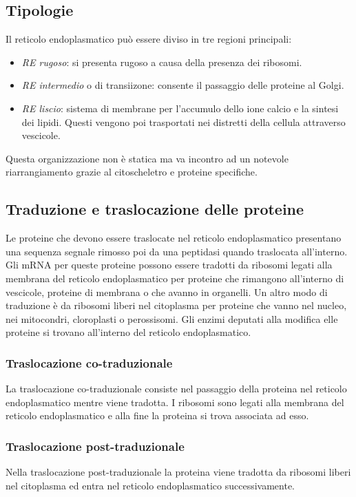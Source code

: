 	\subsection{Tipologie}
	Il reticolo endoplasmatico pu\`o essere diviso in tre regioni principali:
	\begin{multicols}{2}
		\begin{itemize}
			\item \emph{RE rugoso}: si presenta rugoso a causa della presenza dei ribosomi.
			\item \emph{RE intermedio} o di transiizone: consente il passaggio delle proteine al Golgi.
			\item \emph{RE liscio}: sistema di membrane per l'accumulo dello ione calcio e la sintesi dei lipidi.
				Questi vengono poi trasportati nei distretti della cellula attraverso vescicole.
		\end{itemize}
	\end{multicols}
	Questa organizzazione non \`e statica ma va incontro ad un notevole riarrangiamento grazie al citoscheletro e proteine specifiche.

	\subsection{Traduzione e traslocazione delle proteine}
	Le proteine che devono essere traslocate nel reticolo endoplasmatico presentano una sequenza segnale rimosso poi da una peptidasi quando traslocata all'interno.
	Gli mRNA per queste proteine possono essere tradotti da ribosomi legati alla membrana del reticolo endoplasmatico per proteine che rimangono all'interno di vescicole, proteine di membrana o che avanno in organelli.
	Un altro modo di traduzione \`e da ribosomi liberi nel citoplasma per proteine che vanno nel nucleo, nei mitocondri, cloroplasti o perossisomi.
	Gli enzimi deputati alla modifica elle proteine si trovano all'interno del reticolo endoplasmatico.

		\subsubsection{Traslocazione co-traduzionale}
		La traslocazione co-traduzionale consiste nel passaggio della proteina nel reticolo endoplasmatico mentre viene tradotta.
		I ribosomi sono legati alla membrana del reticolo endoplasmatico e alla fine la proteina si trova associata ad esso.

		\subsubsection{Traslocazione post-traduzionale}
		Nella traslocazione post-traduzionale la proteina viene tradotta da ribosomi liberi nel citoplasma ed entra nel reticolo endoplasmatico successivamente.
